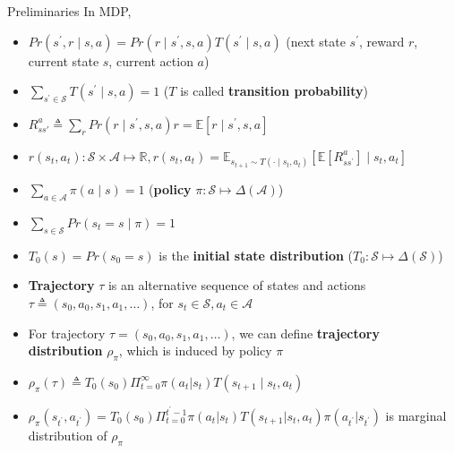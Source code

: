 \documentclass[8pt]{beamer}
\begin{document}
\begin{frame}{Preliminaries}
    In MDP,
    \begin{itemize}
        \item $Pr(s^\prime, r \mid s, a) = Pr(r \mid s^\prime, s, a) T(s^\prime \mid s, a)$ (next state $s^\prime$, reward $r$, current state $s$, current action $a$)
        \item $\sum_{s^\prime \in \mathcal{S}} T(s^\prime \mid s, a) = 1$ ($T$ is called \textbf{transition probability})
        \item $R^a_{ss'} \triangleq \sum_r Pr(r \mid s^\prime, s, a) r = \mathbb{E}[r \mid s^\prime, s, a]$
        \item $r(s_t, a_t): \mathcal{S} \times \mathcal{A} \mapsto \mathbb{R}, r(s_t, a_t) = \mathbb{E}_{s_{t+1}\sim T(\cdot \mid s_t,a_t)}[\mathbb{E}[R^a_{s s^\prime}]  \mid s_t, a_t]$
        \item $\sum_{a \in \mathcal{A}} \pi(a \mid s) = 1$ (\textbf{policy} $\pi : \mathcal{S} \mapsto \Delta(\mathcal{A})$)
        \item $\sum_{s \in \mathcal{S}}Pr(s_t=s \mid \pi) = 1$
        \item $T_0(s) = Pr(s_0=s)$ is the \textbf{initial state distribution} ($T_0 : \mathcal{S} \mapsto \Delta(\mathcal{S})$)
        \item \textbf{Trajectory} $\tau$ is an alternative sequence of states and actions $\tau \triangleq (s_0, a_0, s_1, a_1, \dots)$, for $s_t \in \mathcal{S}, a_t \in \mathcal{A}$
        \item For trajectory $\tau = (s_0, a_0, s_1, a_1, \dots)$, we can define \textbf{trajectory distribution} $\rho_\pi$, which is induced by policy $\pi$
        \item $\rho_\pi(\tau)\triangleq T_0(s_0) \Pi^\infty_{t=0} \pi(a_t|s_t) T(s_{t+1}\mid s_t, a_t)$
        \item $\rho_\pi(s_{t^\prime}, a_{t^\prime}) = T_0(s_0) \Pi_{t=0}^{t^\prime -1} \pi(a_t|s_t)T(s_{t+1}|s_t,a_t) \pi(a_{t^\prime}|s_{t^\prime})$ is marginal distribution of $\rho_\pi$
    \end{itemize}
\end{frame}
\end{document}
